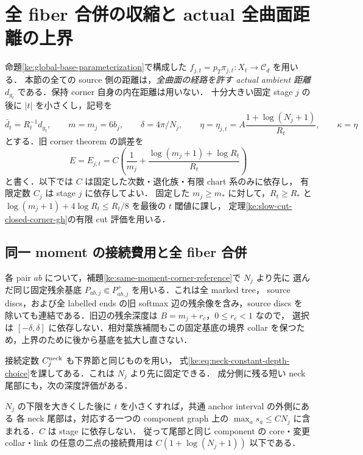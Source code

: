\section{全 fiber 合併の収縮と actual 全曲面距離の上界}
\label{ke:global-ambient-upper-section}

命題\ref{ke:global-base-parameterization}で構成した
$f_{j,t}=p_T\pi_{j,t}:X_t\to\mathcal C_d$ を用いる．
本節の全ての source 側の距離は，\emph{全曲面の経路を許す actual ambient 距離}
$d_{g_t}$ である．保持 corner 自身の内在距離は用いない．
十分大きい固定 stage $j$ の後に $|t|$ を小さくし，記号を
\[
 \bar d_t=R_t^{-1}d_{g_t},\qquad m=m_j=6b_j,\qquad
 \delta=4\pi/N_j,\qquad
 \eta=\eta_{j,t}=A\frac{1+\log(N_j+1)}{R_t},\qquad\kappa=\eta
\]
とする．旧 corner theorem の誤差を
\begin{equation}\label{ke:eq:global-upper-corner-error}
 E=E_{j,t}=C\left(\frac1{m_j}
       +\frac{\log(m_j+1)+\log R_t}{R_t}\right)
\end{equation}
と書く．以下では $C$ は固定した次数・退化族・有限 chart 系のみに依存し，
有限定数 $C_j$ は stage $j$ に依存してよい．
固定した $m_j\ge m_*$ に対して，$R_t\ge R_*$ と
$\log(m_j+1)+4\log R_t\le R_t/8$ を最後の $t$ 閾値に課し，
定理\ref{ke:slow-cut-closed-corner-gh}の有限 cut 評価を用いる．

\subsection{同一 moment の接続費用と全 fiber 合併}

各 pair $ab$ について，補題\ref{ke:same-moment-corner-reference}で $N_j$ より先に
選んだ同じ固定残余基底 $P_{ab,j}\Subset P^+_{ab,j}$ を用いる．これは全 marked tree，
source discs，および全 labelled ends の旧 softmax 辺の残余像を含み，source discs を
除いても連結である．旧辺の残余深度は $B=m_j+r_c$，$0\le r_c<1$ なので，
選択は $[-\delta,\delta]$ に依存しない．相対葉族補間もこの固定基底の境界 collar
を保つため，上界のために後から基底を拡大し直さない．

接続定数 $C_j^{\rm neck}$ も下界節と同じものを用い，
式\eqref{ke:eq:neck-constant-depth-choice}を課してある．これは $N_j$ より先に固定できる．
成分側に残る短い neck 尾部にも，次の深度評価がある．

\begin{lemma}
\label{ke:component-neck-tail-depth}
$N_j$ の下限を大きくした後に $t$ を小さくすれば，共通 anchor interval の外側にある
各 neck 尾部は，対応する一つの component graph 上の
$\max_as_a\le CN_j$ に含まれる．$C$ は stage に依存しない．
従って尾部と同じ component の core・変更 collar・link の任意の二点の接続費用は
$C(1+\log(N_j+1))$ 以下である．
\end{lemma}

